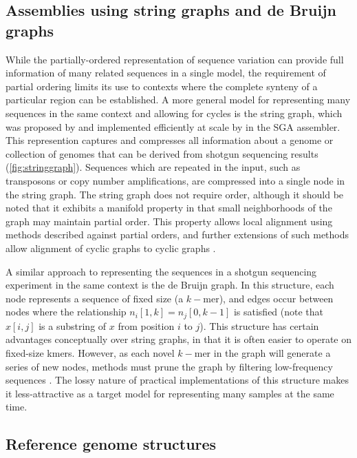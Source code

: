 \documentclass{article}
\begin{document}
\subsection{Assemblies using string graphs and de Bruijn graphs}

While the partially-ordered representation of sequence variation can provide full information of many related sequences in a single model, the requirement of partial ordering limits its use to contexts where the complete synteny of a particular region can be established. A more general model for representing many sequences in the same context and allowing for cycles is the string graph, which was proposed by \cite{myers2005} and implemented efficiently at scale by \cite{simpson2010} in the SGA assembler. This represention captures and compresses all information about a genome or collection of genomes that can be derived from shotgun sequencing results (\ref{fig:stringgraph}). Sequences which are repeated in the input, such as transposons or copy number amplifications, are compressed into a single node in the string graph. The string graph does not require order, although it should be noted that it exhibits a manifold property in that small neighborhoods of the graph may maintain partial order. This property allows local alignment using methods described against partial orders, and further extensions of such methods allow alignment of cyclic graphs to cyclic graphs \cite{myers1989}.

A similar approach to representing the sequences in a shotgun sequencing experiment in the same context is the de Bruijn graph. In this structure, each node represents a sequence of fixed size (a $k-$mer), and edges occur between nodes where the relationship $n_i[1, k] = n_j[0, k-1]$ is satisfied (note that $x[i, j]$ is a substring of $x$ from position $i$ to $j$). This structure has certain advantages conceptually over string graphs, in that it is often easier to operate on fixed-size kmers. However, as each novel $k-$mer in the graph will generate a series of new nodes, methods must prune the graph by filtering low-frequency sequences \cite{iqbal2012}. The lossy nature of practical implementations of this structure makes it less-attractive as a target model for representing many samples at the same time.

\subsection{Reference genome structures}
\end{document}
